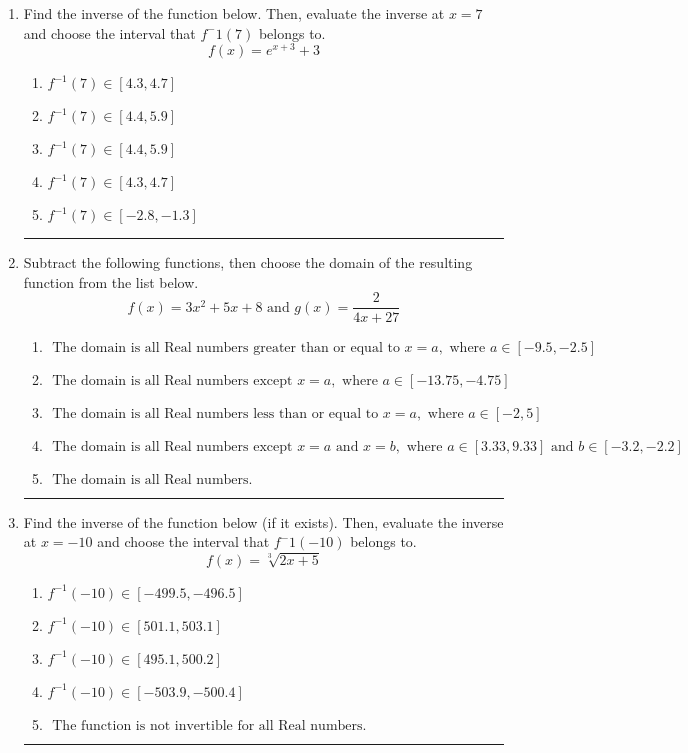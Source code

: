 \documentclass[14pt]{extbook}
\newcommand{\litem}[1]{\item#1\hspace*{-1cm}\rule{\textwidth}{0.4pt}}
\begin{document}
\begin{enumerate}
\litem{
Find the inverse of the function below. Then, evaluate the inverse at $x = 7$ and choose the interval that $f^-1(7)$ belongs to.\[ f(x) = e^{x+3}+3 \]\begin{enumerate}[label=\Alph*.]
\item \( f^{-1}(7) \in [4.3, 4.7] \)
\item \( f^{-1}(7) \in [4.4, 5.9] \)
\item \( f^{-1}(7) \in [4.4, 5.9] \)
\item \( f^{-1}(7) \in [4.3, 4.7] \)
\item \( f^{-1}(7) \in [-2.8, -1.3] \)

\end{enumerate} }
\litem{
Subtract the following functions, then choose the domain of the resulting function from the list below.\[ f(x) = 3x^{2} +5 x + 8 \text{ and } g(x) = \frac{2}{4x+27} \]\begin{enumerate}[label=\Alph*.]
\item \( \text{ The domain is all Real numbers greater than or equal to } x = a, \text{ where } a \in [-9.5, -2.5] \)
\item \( \text{ The domain is all Real numbers except } x = a, \text{ where } a \in [-13.75, -4.75] \)
\item \( \text{ The domain is all Real numbers less than or equal to } x = a, \text{ where } a \in [-2, 5] \)
\item \( \text{ The domain is all Real numbers except } x = a \text{ and } x = b, \text{ where } a \in [3.33, 9.33] \text{ and } b \in [-3.2, -2.2] \)
\item \( \text{ The domain is all Real numbers. } \)

\end{enumerate} }
\litem{
Find the inverse of the function below (if it exists). Then, evaluate the inverse at $x = -10$ and choose the interval that $f^-1(-10)$ belongs to.\[ f(x) = \sqrt[3]{2 x + 5} \]\begin{enumerate}[label=\Alph*.]
\item \( f^{-1}(-10) \in [-499.5, -496.5] \)
\item \( f^{-1}(-10) \in [501.1, 503.1] \)
\item \( f^{-1}(-10) \in [495.1, 500.2] \)
\item \( f^{-1}(-10) \in [-503.9, -500.4] \)
\item \( \text{ The function is not invertible for all Real numbers. } \)


\end{enumerate}}
\end{enumerate}
\end{document}
